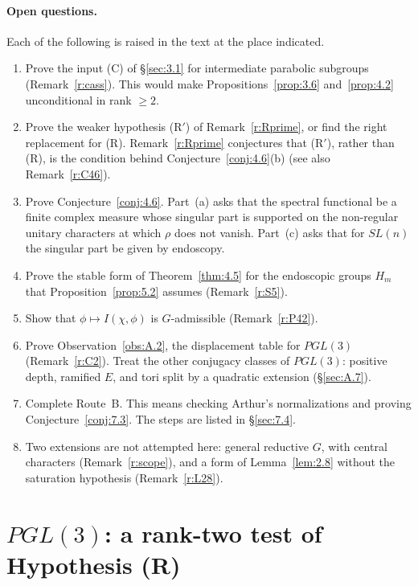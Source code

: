 \documentclass[12pt,letterpaper]{article}
\numberwithin{equation}{section}
\theoremstyle{plain}
\theoremstyle{remark}
\theoremstyle{plain}
\theoremstyle{definition}
\theoremstyle{remark}
\theoremstyle{remark}
\begin{document}
\paragraph{Open questions.} Each of the following is raised in the text at the place indicated.
\begin{enumerate}
\item Prove the input (C) of \S\ref{sec:3.1} for intermediate parabolic subgroups (Remark~\ref{r:cass}). This would make Propositions~\ref{prop:3.6} and~\ref{prop:4.2} unconditional in rank $\ge2$.
\item Prove the weaker hypothesis (R$'$) of Remark~\ref{r:Rprime}, or find the right replacement for (R). Remark~\ref{r:Rprime} conjectures that (R$'$), rather than (R), is the condition behind Conjecture~\ref{conj:4.6}(b) (see also Remark~\ref{r:C46}).
\item Prove Conjecture~\ref{conj:4.6}. Part~(a) asks that the spectral functional be a finite complex measure whose singular part is supported on the non-regular unitary characters at which $\rho$ does not vanish. Part~(c) asks that for $SL(n)$ the singular part be given by endoscopy.
\item Prove the stable form of Theorem~\ref{thm:4.5} for the endoscopic groups $H_m$ that Proposition~\ref{prop:5.2} assumes (Remark~\ref{r:S5}).
\item Show that $\phi\mapsto I(\chi,\phi)$ is $G$-admissible (Remark~\ref{r:P42}).
\item Prove Observation~\ref{obs:A.2}, the displacement table for $PGL(3)$ (Remark~\ref{r:C2}). Treat the other conjugacy classes of $PGL(3)$: positive depth, ramified $E$, and tori split by a quadratic extension (\S\ref{sec:A.7}).
\item Complete Route~B. This means checking Arthur's normalizations and proving Conjecture~\ref{conj:7.3}. The steps are listed in \S\ref{sec:7.4}.
\item Two extensions are not attempted here: general reductive $G$, with central characters (Remark~\ref{r:scope}), and a form of Lemma~\ref{lem:2.8} without the saturation hypothesis (Remark~\ref{r:L28}).
\end{enumerate}

\appendix
\section{\texorpdfstring{$PGL(3)$}{PGL(3)}: a rank-two test of Hypothesis (R)}\label{app:pgl3}
\end{document}
